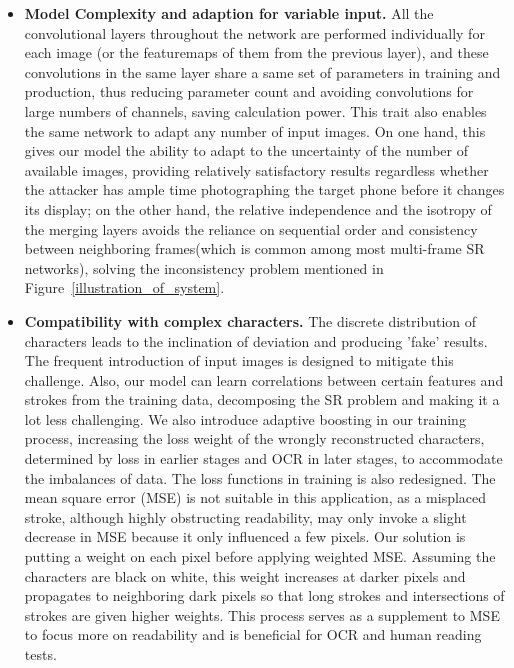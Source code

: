 \begin{itemize}[leftmargin=*]
    \item \textbf{Model Complexity and adaption for variable input.} All the convolutional layers throughout the network are performed individually for each image (or the featuremaps of them from the previous layer), and these convolutions in the same layer share a same set of parameters in training and production, thus reducing parameter count and avoiding convolutions for large numbers of channels, saving calculation power. This trait also enables the same network to adapt any number of input images. On one hand, this gives our model the ability to adapt to the uncertainty of the number of available images, providing relatively satisfactory results regardless whether the attacker has ample time photographing the target phone before it changes its display; on the other hand, the relative independence and the isotropy of the merging layers avoids the reliance on sequential order and consistency between neighboring frames(which is common among most multi-frame SR networks), solving the inconsistency problem mentioned in Figure~\ref{illustration_of_system}.
    \item \textbf{Compatibility with complex characters.} The discrete distribution of characters leads to the inclination of deviation and producing 'fake' results. The frequent introduction of input images is designed to mitigate this challenge. Also, our model can learn correlations between certain features and strokes from the training data, decomposing the SR problem and making it a lot less challenging. We also introduce adaptive boosting\cite{adaboost} in our training process, increasing the loss weight of the wrongly reconstructed characters, determined by loss in earlier stages and OCR in later stages, to accommodate the imbalances of data. The loss functions in training is also redesigned. The mean square error (MSE) is not suitable in this application, as a misplaced stroke, although highly obstructing readability, may only invoke a slight decrease in MSE because it only influenced a few pixels. Our solution is putting a weight on each pixel before applying weighted MSE. Assuming the characters are black on white, this weight increases at darker pixels and propagates to neighboring dark pixels so that long strokes and intersections of strokes are given higher weights. This process serves as a supplement to MSE to focus more on readability and is beneficial for OCR and human reading tests. 
  \end{itemize}

